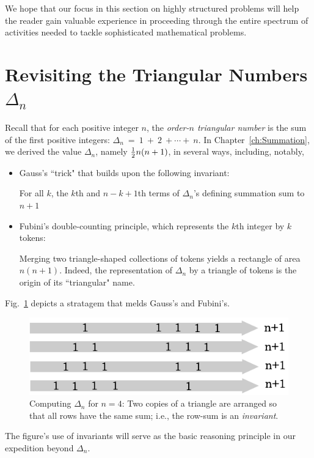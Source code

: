 \smallskip

We hope that our focus in this section on highly structured problems will help the reader gain valuable experience in proceeding through the entire spectrum of activities needed to tackle sophisticated mathematical problems.


\section{Revisiting the Triangular Numbers $\Delta_n$}

 

Recall that for each positive integer $n$, the {\it order-$n$ triangular number} is the sum of the  first positive integers: $\Delta_n \ = \ 1 \ + \ 2 \ + \cdots + \ n$.  In Chapter~\ref{ch:Summation}, we derived the value $\Delta_n$, namely ${1 \over 2}n(n+1)$, in several ways, including, notably,
\begin{itemize}
\item
Gauss's ``trick" that builds upon the following invariant: 

For all $k$, the $k$th and $n-k+1$th terms of $\Delta_n$'s defining summation sum to $n+1$ 
\item 
Fubini's double-counting principle, which represents the $k$th integer by $k$ tokens:

Merging two triangle-shaped collections of tokens yields a rectangle of area $n(n+1)$.  Indeed, the representation of $\Delta_n$ by a triangle of tokens is the origin of its ``triangular" name.
\end{itemize}
Fig.~\ref{fig:Tetrahedral2} depicts a stratagem that melds Gauss's and Fubini's.
\begin{figure}[h]
\begin{center}
        \includegraphics[scale=0.4]{FiguresArithmetic/appTetrahedral2}
        \caption{Computing $\Delta_n$ for $n=4$: Two copies of a triangle are arranged so that all rows have the same sum; i.e., the row-sum is an {\em invariant}.}
        \label{fig:Tetrahedral2}
\end{center}
\end{figure}
The figure's use of invariants will serve as the basic reasoning principle in our expedition beyond $\Delta_n$.


